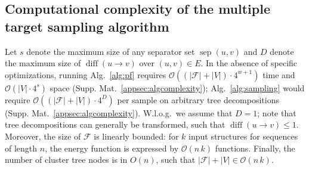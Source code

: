 \documentclass[twocolumn]{bmcart}%
\newcommand{\val}{\bar S} %
\newcommand{\separator}[2]{\operatorname{sep}(#1,#2)}
\newcommand{\difference}[2]{\operatorname{diff}(#1 \rightarrow #2)}
\newcommand{\Message}[2]{m_{#1\rightarrow #2}}
\newcommand{\partseqs}{\mathcal{P\!S}}
\newcommand{\F}{\mathcal{F}}
\newcommand{\substitute}[2]{#1\cup#2}
\newcommand{\evalfor}[2]{#1(#2)}
\renewcommand{\gets}{:=}
\begin{document}
\subsection*{Computational complexity of the multiple target sampling algorithm}\label{sec:complexity}

Let $s$ denote the maximum size of any separator set $\separator{u}{v}$ and $D$ denote the maximum size of
$\difference{u}{v}$ over $(u,v)\in E$.  In the absence
of specific optimizations, running Alg.~\ref{alg:pf} requires
$\mathcal{O}((|\F|+|V|)\cdot 4^{w+1})$ time and
$\mathcal{O}(|V|\cdot4^s)$ space
(Supp. Mat.~\ref{appsec:algcomplexity}); Alg.~\ref{alg:sampling} would
require $\mathcal{O}((|\F|+|V|)\cdot 4^D)$ per sample on arbitrary
tree decompositions
(Supp. Mat.~\ref{appsec:algcomplexity}). W.l.o.g.\ we assume that
$D=1$; note that tree decompositions can generally be transformed,
such that $\difference{u}{v}\leq 1$.
%
Moreover, the size of $\F$ is linearly bounded: for $k$
input structures for sequences of length $n$, the energy function is
expressed by $\mathcal{O}(n\,k)$ functions. Finally, the number of cluster
tree nodes is in $O(n)$, such that $|\F|+|V| \in \mathcal{O}(n\,k)$.


\end{document}
